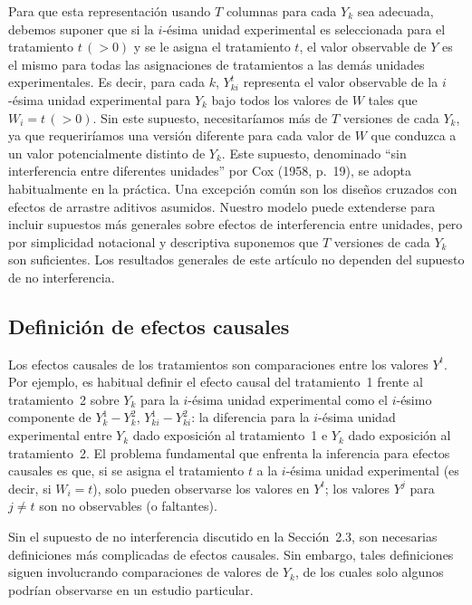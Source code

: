 \documentclass[12pt,a4paper]{article}
\begin{document}
Para que esta representación usando $T$ columnas para cada $Y_k$ sea adecuada, debemos
suponer que si la $i$-ésima unidad experimental es seleccionada para el tratamiento
$t\,(>0)$ y se le asigna el tratamiento $t$, el valor observable de $Y$ es el mismo
para todas las asignaciones de tratamientos a las demás unidades experimentales. Es decir,
para cada $k$, $Y^t_{ki}$ representa el valor observable de la $i$-ésima unidad
experimental para $Y_k$ bajo todos los valores de $W$ tales que $W_i = t\,(>0)$. Sin
este supuesto, necesitaríamos más de $T$ versiones de cada $Y_k$, ya que requeriríamos
una versión diferente para cada valor de $W$ que conduzca a un valor potencialmente
distinto de $Y_k$. Este supuesto, denominado ``sin interferencia entre diferentes
unidades'' por Cox (1958, p.~19), se adopta habitualmente en la práctica. Una excepción
común son los diseños cruzados con efectos de arrastre aditivos asumidos. Nuestro modelo
puede extenderse para incluir supuestos más generales sobre efectos de interferencia entre
unidades, pero por simplicidad notacional y descriptiva suponemos que $T$ versiones de
cada $Y_k$ son suficientes. Los resultados generales de este artículo no dependen del
supuesto de no interferencia.

\subsection{Definición de efectos causales}

Los efectos causales de los tratamientos son comparaciones entre los valores $Y^t$. Por
ejemplo, es habitual definir el efecto causal del tratamiento~1 frente al tratamiento~2
sobre $Y_k$ para la $i$-ésima unidad experimental como el $i$-ésimo componente de
$Y^1_k - Y^2_k$, $Y^1_{ki} - Y^2_{ki}$: la diferencia para la $i$-ésima unidad
experimental entre $Y_k$ dado exposición al tratamiento~1 e $Y_k$ dado exposición al
tratamiento~2. El problema fundamental que enfrenta la inferencia para efectos causales es
que, si se asigna el tratamiento $t$ a la $i$-ésima unidad experimental (es decir, si
$W_i = t$), solo pueden observarse los valores en $Y^t$; los valores $Y^j$ para $j \ne t$
son no observables (o faltantes).

Sin el supuesto de no interferencia discutido en la Sección~2.3, son necesarias
definiciones más complicadas de efectos causales. Sin embargo, tales definiciones siguen
involucrando comparaciones de valores de $Y_k$, de los cuales solo algunos podrían
observarse en un estudio particular.
\end{document}
